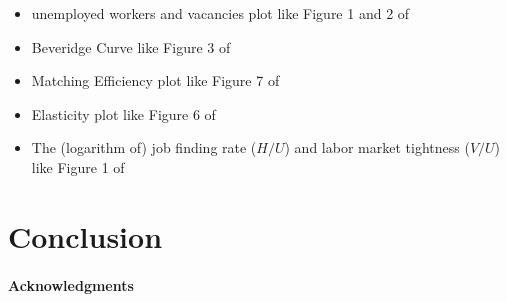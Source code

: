 \documentclass[12pt]{article}
\begin{document}
\begin{itemize}
    \item unemployed workers and vacancies plot like Figure 1 and 2 of \cite{lange2020beyond}
    \item Beveridge Curve like Figure 3 of \cite{lange2020beyond}
    \item Matching Efficiency plot like Figure 7 of \cite{lange2020beyond}
    \item Elasticity plot like Figure 6 of \cite{lange2020beyond}
    \item The (logarithm of) job finding rate ($H/U$) and labor market tightness ($V/U$) like Figure 1 of \cite{borowczyk2013accounting}
    
\end{itemize}

\section{Conclusion}


\paragraph{Acknowledgments}





\end{document}
